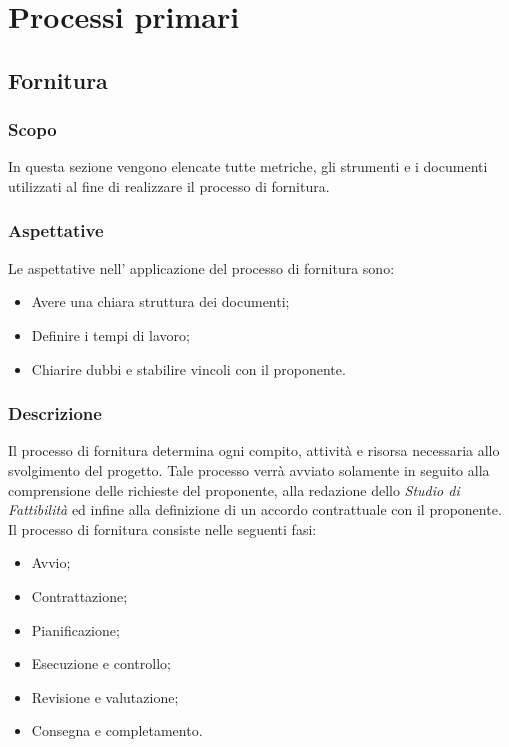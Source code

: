 
\section{Processi primari}\label{section:Processi_primari}
\subsection{Fornitura} \label{subsection:Fornitura}
\subsubsection{Scopo}\label{subsubsection: scopo_fornitura}
In questa sezione vengono elencate tutte metriche, gli strumenti e i documenti utilizzati al fine di realizzare il processo di fornitura.
\subsubsection{Aspettative}\label{subsubsection: aspettative_fornitura}
Le aspettative nell' applicazione del processo di fornitura sono:
\begin {itemize}
    \item Avere una chiara struttura dei documenti;
    \item Definire i tempi di lavoro;
    \item Chiarire dubbi e stabilire vincoli con il proponente.
\end {itemize}
\subsubsection{Descrizione}\label{subsubsection: descrizione_fornitura}
Il processo di fornitura determina ogni compito, attività e risorsa necessaria allo svolgimento del progetto.
Tale processo verrà avviato solamente in seguito alla comprensione delle richieste del proponente, alla redazione dello \textit{Studio di Fattibilità} ed infine alla definizione di un accordo contrattuale con il proponente.
Il processo di fornitura consiste nelle seguenti fasi:
\begin {itemize}
    \item Avvio;
    \item Contrattazione;
    \item Pianificazione;
    \item Esecuzione e controllo;
    \item Revisione e valutazione;
    \item Consegna e completamento.
\end {itemize}
